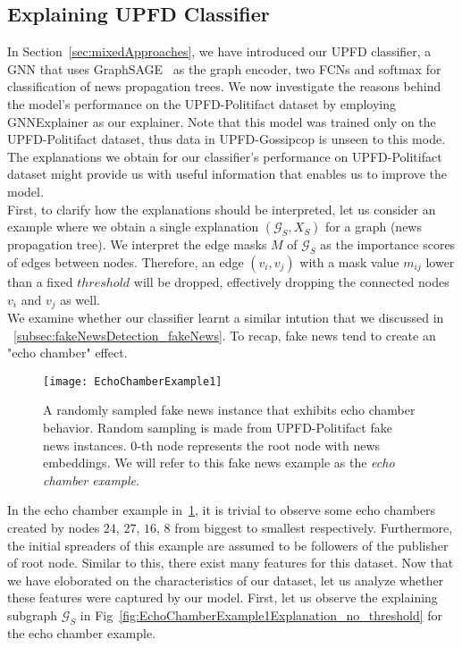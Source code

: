 \subsection{Explaining UPFD Classifier}
\label{subsec:ExplaniningGNNs_ExplainingUPFDClassifier}
In Section~\ref{sec:mixedApproaches}, we have introduced our UPFD classifier, a GNN that uses GraphSAGE~\parencite{GraphSAGE_Hamilton} as the graph encoder, two FCNs and softmax for classification of news propagation trees. We now investigate the reasons behind the model's performance on the UPFD-Politifact dataset by employing GNNExplainer as our explainer. Note that this model was trained only on the UPFD-Politifact dataset, thus data in UPFD-Gossipcop is unseen to this mode. The explanations we obtain for our classifier's performance on UPFD-Politifact dataset might provide us with useful information that enables us to improve the model.\\
First, to clarify how the explanations should be interpreted, let us consider an example where we obtain a single explanation $(\mathcal{G}_S, X_S)$ for a graph (news propagation tree). We interpret the edge masks $M$ of $\mathcal{G}_S$ as the importance scores of edges between nodes. Therefore, an edge $(v_i, v_j)$ with a mask value $m_{ij}$ lower than a fixed $threshold$ will be dropped, effectively dropping the connected nodes $v_i$ and $v_j$ as well.\\
We examine whether our classifier learnt a similar intution that we discussed in ~\ref{subsec:fakeNewsDetection_fakeNews}. To recap, fake news tend to create an "echo chamber" effect.\\
\begin{figure}
    \centering
    \texttt{[image: EchoChamberExample1]}
    \caption[Echo chamber example from UPFD-Politifact.]{A randomly sampled fake news instance that exhibits echo chamber behavior. Random sampling is made from UPFD-Politifact fake news instances. $0$-th node represents the root node with news embeddings. We will refer to this fake news example as the \emph{echo chamber example}.}
    \label{fig:echoChamberExample1}
\end{figure}
In the echo chamber example in~\ref{fig:echoChamberExample1}, it is trivial to observe some echo chambers created by nodes $24$, $27$, $16$, $8$ from biggest to smallest respectively. Furthermore, the initial spreaders of this example are assumed to be followers of the publisher of root node. Similar to this, there exist many features for this dataset.
Now that we have eloborated on the characteristics of our dataset, let us analyze whether these features were captured by our model. First, let us observe the explaining subgraph $\mathcal{G}_S$ in Fig~\ref{fig:EchoChamberExample1Explanation_no_threshold} for the echo chamber example.
